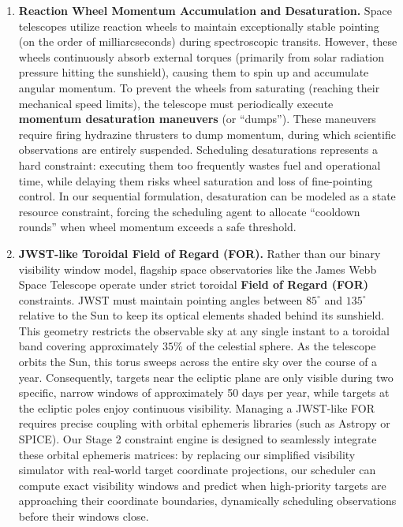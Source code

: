 \documentclass[11pt,a4paper]{article}
\begin{document}
\begin{enumerate}
    \item \textbf{Reaction Wheel Momentum Accumulation and Desaturation.}
    Space telescopes utilize reaction wheels to maintain exceptionally stable pointing (on the order of milliarcseconds) during spectroscopic transits. However, these wheels continuously absorb external torques (primarily from solar radiation pressure hitting the sunshield), causing them to spin up and accumulate angular momentum. To prevent the wheels from saturating (reaching their mechanical speed limits), the telescope must periodically execute \textbf{momentum desaturation maneuvers} (or ``dumps''). These maneuvers require firing hydrazine thrusters to dump momentum, during which scientific observations are entirely suspended. 
    Scheduling desaturations represents a hard constraint: executing them too frequently wastes fuel and operational time, while delaying them risks wheel saturation and loss of fine-pointing control. In our sequential formulation, desaturation can be modeled as a state resource constraint, forcing the scheduling agent to allocate ``cooldown rounds'' when wheel momentum exceeds a safe threshold.

    \item \textbf{JWST-like Toroidal Field of Regard (FOR).}
    Rather than our binary visibility window model, flagship space observatories like the James Webb Space Telescope operate under strict toroidal \textbf{Field of Regard (FOR)} constraints. JWST must maintain pointing angles between $85^\circ$ and $135^\circ$ relative to the Sun to keep its optical elements shaded behind its sunshield. This geometry restricts the observable sky at any single instant to a toroidal band covering approximately $35\%$ of the celestial sphere. As the telescope orbits the Sun, this torus sweeps across the entire sky over the course of a year. Consequently, targets near the ecliptic plane are only visible during two specific, narrow windows of approximately 50 days per year, while targets at the ecliptic poles enjoy continuous visibility. 
    Managing a JWST-like FOR requires precise coupling with orbital ephemeris libraries (such as Astropy or SPICE). Our Stage 2 constraint engine is designed to seamlessly integrate these orbital ephemeris matrices: by replacing our simplified visibility simulator with real-world target coordinate projections, our scheduler can compute exact visibility windows and predict when high-priority targets are approaching their coordinate boundaries, dynamically scheduling observations before their windows close.
\end{enumerate}
\end{document}
